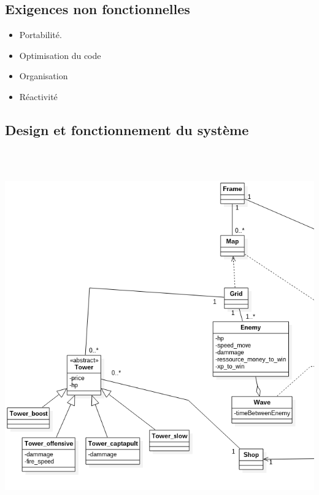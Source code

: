 \documentclass[10pt,a4paper]{article}
\begin{document}
\subsection{Exigences non fonctionnelles}

\begin{itemize}
    \item Portabilité. 
    \item Optimisation du code 
    \item Organisation 
    \item Réactivité 
\end{itemize}
\subsection{Design et fonctionnement du système}
  \includegraphics[height=16cm,width=16cm]{Class_ingame.png} 
  \newpage
\end{document}
